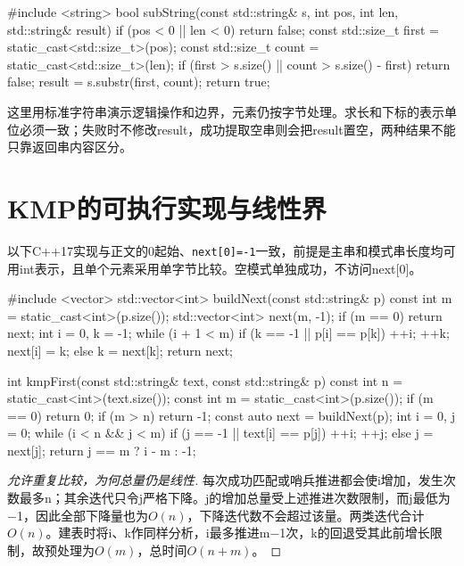 \begin{codeblock}[language=C++]
#include <string>
bool subString(const std::string& s, int pos, int len,
               std::string& result) {
    if (pos < 0 || len < 0) return false;
    const std::size_t first = static_cast<std::size_t>(pos);
    const std::size_t count = static_cast<std::size_t>(len);
    if (first > s.size() || count > s.size() - first)
        return false;
    result = s.substr(first, count);
    return true;
}
\end{codeblock}

这里用标准字符串演示逻辑操作和边界，元素仍按字节处理。求长和下标的表示单位必须一致；失败时不修改result，成功提取空串则会把result置空，两种结果不能只靠返回串内容区分。

\section{KMP的可执行实现与线性界}\label{DS04-code}

以下C++17实现与正文的0起始、\texttt{next[0]=\allowbreak{}-1}一致，前提是主串和模式串长度均可用int表示，且单个元素采用单字节比较。空模式单独成功，不访问next{[}0{]}。

\begin{codeblock}[language=C++]
#include <vector>
std::vector<int> buildNext(const std::string& p) {
    const int m = static_cast<int>(p.size());
    std::vector<int> next(m, -1);
    if (m == 0) return next;
    int i = 0, k = -1;
    while (i + 1 < m) {
        if (k == -1 || p[i] == p[k]) {
            ++i; ++k;
            next[i] = k;
        } else {
            k = next[k];
        }
    }
    return next;
}
\end{codeblock}

\begin{codeblock}[language=C++]
int kmpFirst(const std::string& text, const std::string& p) {
    const int n = static_cast<int>(text.size());
    const int m = static_cast<int>(p.size());
    if (m == 0) return 0;
    if (m > n) return -1;
    const auto next = buildNext(p);
    int i = 0, j = 0;
    while (i < n && j < m) {
        if (j == -1 || text[i] == p[j]) {
            ++i; ++j;
        } else {
            j = next[j];
        }
    }
    return j == m ? i - m : -1;
}
\end{codeblock}

\begin{proof}[允许重复比较，为何总量仍是线性]

每次成功匹配或哨兵推进都会使i增加，发生次数最多n；其余迭代只令j严格下降。j的增加总量受上述推进次数限制，而j最低为\ensuremath{-}1，因此全部下降量也为\(O(n)\)，下降迭代数不会超过该量。两类迭代合计\(O(n)\)。建表时将i、k作同样分析，i最多推进m\ensuremath{-}1次，k的回退受其此前增长限制，故预处理为\(O(m)\)，总时间\(O(n+m)\)。

\end{proof}

